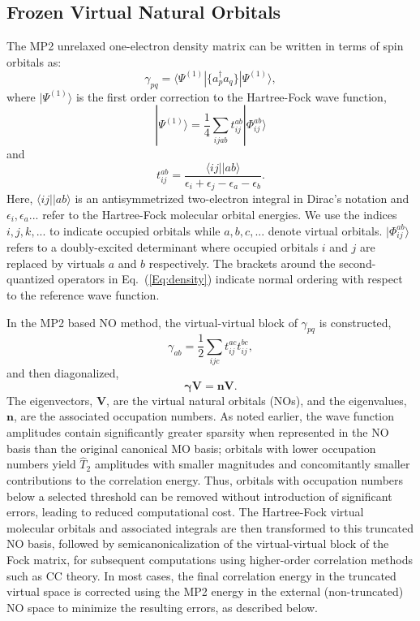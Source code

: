 \subsection{Frozen Virtual Natural Orbitals}

The MP2 unrelaxed one-electron density matrix can be written in terms of
spin orbitals as: 
\begin{equation}
\gamma_{pq} = \langle \Psi^{(1)}|\{ a^{\dagger}_{p}a_q\}|\Psi^{(1)}\rangle,
\label{Eq:density}
\end{equation}
where $|\Psi^{(1)}\rangle$ is the first order correction to the Hartree-Fock
wave function,
\begin{equation}
|\Psi^{(1)}\rangle = \frac{1}{4}\sum_{ijab} t^{ab}_{ij}|\Phi^{ab}_{ij}\rangle
\end{equation}
and
\begin{equation}
t^{ab}_{ij} = \frac{\langle ij||ab\rangle}{\epsilon_i + \epsilon_j -
\epsilon_a - \epsilon_b}.
\end{equation}
Here, $\langle ij||ab\rangle$ is an antisymmetrized two-electron integral in
Dirac's notation and $\epsilon_i,\epsilon_a...$ refer to the Hartree-Fock
molecular orbital energies. We use the indices $i,j,k,...$ to indicate occupied
orbitals while $a,b,c,...$ denote virtual orbitals. $|\Phi^{ab}_{ij}\rangle$
refers to a doubly-excited determinant where occupied orbitals $i$ and $j$ are
replaced by virtuals $a$ and $b$ respectively.  The brackets around the
second-quantized operators in Eq.~(\ref{Eq:density}) indicate normal ordering
with respect to the reference wave function.

In the MP2 based NO method, the virtual-virtual block of $\gamma_{pq}$
is constructed,
\begin{equation}
\gamma_{ab} = \frac{1}{2}\sum_{ijc} t^{ac}_{ij}t^{bc}_{ij},
\label{Eq:dens}
\end{equation}
and then diagonalized,
\begin{equation}
\bm{\gamma} \bm{V} = \bm{n} \bm{V}.
\end{equation}
The eigenvectors, $\bm{V}$, are the virtual natural orbitals (NOs), and the
eigenvalues, $\bm{n}$, are the associated occupation numbers.  As noted
earlier, the wave function amplitudes contain significantly greater sparsity
when represented in the NO basis than the original canonical MO basis;
orbitals with lower occupation numbers yield $\hat{T}_2$ amplitudes with
smaller magnitudes and concomitantly smaller contributions to the correlation
energy.  Thus, orbitals with occupation numbers below a selected threshold can
be removed without introduction of significant errors, leading to reduced
computational cost.  The Hartree-Fock virtual molecular orbitals and
associated integrals are then transformed to this truncated NO basis, followed
by semicanonicalization of the virtual-virtual block of the Fock matrix, for
subsequent computations using higher-order correlation methods such as CC
theory.  In most cases, the final correlation energy in the truncated virtual
space is corrected using the MP2 energy in the external (non-truncated) NO
space to minimize the resulting errors, as described below.

